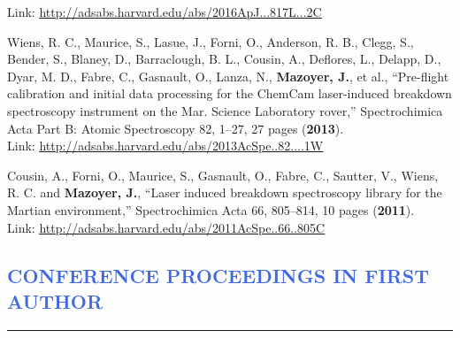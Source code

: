\documentclass[12pt]{article}
\begin{document}
\begin{etaremune}
 Link: \textcolor{BrickRed}{\underline{\url{http://adsabs.harvard.edu/abs/2016ApJ...817L...2C}}}
\item Wiens, R. C., Maurice, S., Lasue, J., Forni, O., Anderson, R. B., Clegg, S., Bender, S., Blaney, D., Barraclough, B. L., Cousin, A., Deflores, L., Delapp, D., Dyar, M. D., Fabre, C., Gasnault, O., Lanza, N., \textbf{Mazoyer, J.}, et al., “Pre-flight calibration and initial data processing for the ChemCam laser-induced breakdown spectroscopy instrument on the Mar. Science Laboratory rover,” Spectrochimica Acta Part B: Atomic Spectroscopy 82, 1–27, 27 pages (\textbf{2013}).\\
Link: \textcolor{BrickRed}{\underline{\url{http://adsabs.harvard.edu/abs/2013AcSpe..82....1W}}}
\item Cousin, A., Forni, O., Maurice, S., Gasnault, O., Fabre, C., Sautter, V., Wiens, R. C. and \textbf{Mazoyer, J.}, “Laser induced breakdown spectroscopy library for the Martian environment,” Spectrochimica Acta 66, 805–814, 10 pages (\textbf{2011}).\\
Link: \textcolor{BrickRed}{\underline{\url{http://adsabs.harvard.edu/abs/2011AcSpe..66..805C}}}
\end{etaremune}


\vspace{-1cm}
\textcolor{RoyalBlue}{\section{\large CONFERENCE PROCEEDINGS IN FIRST AUTHOR}
\vspace{-0.35cm}\hrule}
\vspace{0.5cm}
\end{document}
